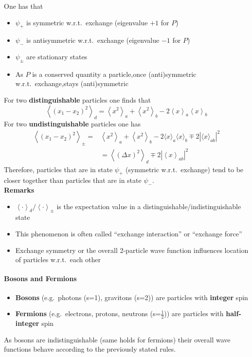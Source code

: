 One has that
\begin{itemize}
    \item $\psi_{+}$ is symmetric w.r.t.\ exchange (eigenvalue $+1$ for $P$)
    \item $\psi_{-}$ is antisymmetric w.r.t.\ exchange (eigenvalue $-1$ for $P$)
    \item $\psi_{\pm}$ are stationary states
    \item As $P$ is a conserved quantity a particle,\newline once (anti)symmetric w.r.t.\ exchange,\newline stays (anti)symmetric
\end{itemize}
For two \textbf{distinguishable} particles one finds that
\begin{equation*}
    \left\langle{\left(x_{1}-x_{2}\right)}^{2}\right\rangle_{d}=\left\langle x^{2}\right\rangle_{a}+\left\langle x^{2}\right\rangle_{b}-2\left\langle x\right\rangle_{a}\left\langle x\right\rangle_{b}
\end{equation*}
For two \textbf{undistinguishable} particles one has
\begin{align*}
    \left\langle{\left(x_{1}-x_{2}\right)}^{2}\right\rangle_{\pm}= & \left\langle x^{2}\right\rangle_{a}+\left\langle x^{2}\right\rangle_{b}-2\langle x\rangle_{a}\langle x\rangle_{b}\mp2|\langle x\rangle_{ab}|^{2} \\
                                                                   & =\left\langle{\left(\Delta x\right)}^{2}\right\rangle_{d}\mp2\left|\left\langle x\right\rangle_{ab}\right|^{2}
\end{align*}
Therefore, particles that are in state $\psi_{+}$ (symmetric w.r.t.\ exchange) tend to be closer together than particles that are in state $\psi_{-}$.\\
\textbf{Remarks}
\begin{itemize}
    \item $\left\langle\cdot\right\rangle_{d}/\left\langle\cdot\right\rangle_{\pm}$ is the expectation value in a distinguishable/indistinguishable state
    \item This phenomenon is often called ``exchange interaction'' or ``exchange force''
    \item Exchange symmetry or the overall 2-particle wave function influences location of particles w.r.t.\ each other
\end{itemize}

\paragraph{Bosons and Fermions}
\begin{itemize}
    \item \textbf{Bosons} (e.g.\ photons (s=1), gravitons (s=2)) are particles with \textbf{integer} spin
    \item \textbf{Fermions} (e.g.\ electrons, protons, neutrons (s=$\frac{1}{2}$)) are particles with \textbf{half-integer} spin
\end{itemize}
As bosons are indistinguishable (same holds for fermions) their overall wave functions behave according to the previously stated rules.

